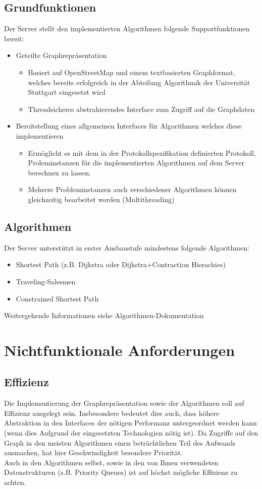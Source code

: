 \documentclass[a4paper,10pt,titlepage,parskip=true]{article}
\begin{document}
\subsection{Grundfunktionen}
Der Server stellt den implementierten Algorithmen folgende Supportfunktionen bereit:
\begin{itemize}
 \item Geteilte Graphrepräsentation
  \begin{itemize}
   \item 
    Basiert auf OpenStreetMap und einem textbasierten Graphformat, welches 
    bereits erfolgreich in der Abteilung Algorithmik der Universität Stuttgart eingesetzt wird
   \item
    Threadsicheres abstrahierendes Interface zum Zugriff auf die Graphdaten
  \end{itemize}
  \item Bereitstellung eines allgemeinen Interfaces für Algorithmen welches diese implementieren
  \begin{itemize}
   \item Ermöglicht es mit dem in der Protokollspezifikation definierten Protokoll, Proleminstanzen für die implementierten Algorithmen auf dem Server berechnen zu lassen.
   \item Mehrere Probleminstanzen auch verschiedener Algorithmen können gleichzeitig bearbeitet werden (Multithreading)

  \end{itemize}
\end{itemize}
\subsection{Algorithmen}
Der Server unterstützt in erster Ausbaustufe mindestens folgende Algorithmen:
\begin{itemize}
 \item Shortest Path (z.B. Dijkstra oder Dijkstra+Contraction Hierachies)
 \item Traveling-Salesmen
 \item Constrained Shortest Path
\end{itemize}

Weitergehende Informationen siehe Algorithmen-Dokumentation 

\section{Nichtfunktionale Anforderungen}
\subsection{Effizienz}
Die Implementierung der Graphrepräsentation sowie der Algorithmen soll auf Effizienz ausgelegt sein.
Insbesondere bedeutet dies auch, dass höhere Abstraktion in den Interfaces der nötigen Performanz
untergeordnet werden kann (wenn dies Aufgrund der eingesetzten Technologien nötig ist). Da Zugriffe auf den Graph in den meisten Algorithmen einen beträchtlichen Teil des Aufwands ausmachen, hat hier
Geschwindigkeit besondere Priorität.\\
Auch in den Algorithmen selbst, sowie in den von Ihnen verwendeten Datenstrukturen (z.B. Priority Queues) ist auf höchst mögliche Effizienz zu achten.
\end{document}
